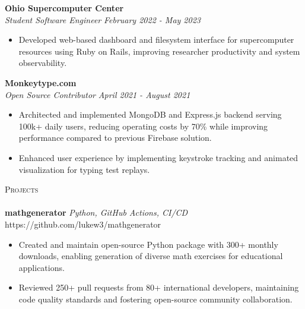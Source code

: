 \documentclass[letterpaper]{article}
\newcommand{\lineunder} {
    \vspace*{-8pt} \\
    \hspace*{-18pt} \hrulefill \\
}
\newcommand{\header} [1] {
    {\hspace*{-18pt}\vspace*{6pt} \textsc{#1}}
    \vspace*{-6pt} \lineunder
}
\begin{document}
    \textbf{Ohio Supercomputer Center}\\
    
    \textit{Student Software Engineer} \hfill \textsl{February 2022 - May 2023}\\
    \vspace{-7pt}
    \begin{itemize} \itemsep -1mm
        
            \item Developed web-based dashboard and filesystem interface for supercomputer resources using Ruby on Rails, improving researcher productivity and system observability.

    \end{itemize}
    \vspace{-2mm}

    	\textbf{Monkeytype.com}\\
    
    \textit{Open Source Contributor} \hfill \textsl{April 2021 - August 2021}\\
    \vspace{-7pt}
    \begin{itemize} \itemsep -1mm
            \item Architected and implemented MongoDB and Express.js backend serving 100k+ daily users, reducing operating costs by 70\% while improving performance compared to previous Firebase solution.

            \item Enhanced user experience by implementing keystroke tracking and animated visualization for typing test replays.

    \end{itemize}
    \vspace{-2mm}

\header{Projects}

    {\textbf{mathgenerator}} {\sl Python, GitHub Actions, CI/CD} \hfill https://github.com/lukew3/mathgenerator\\
    \vspace{-2mm}
    \begin{itemize} \itemsep -1mm
    
        \item Created and maintain open-source Python package with 300+ monthly downloads, enabling generation of diverse math exercises for educational applications.

        \item Reviewed 250+ pull requests from 80+ international developers, maintaining code quality standards and fostering open-source community collaboration.

    \end{itemize}
    \vspace{-2mm}
\end{document}
